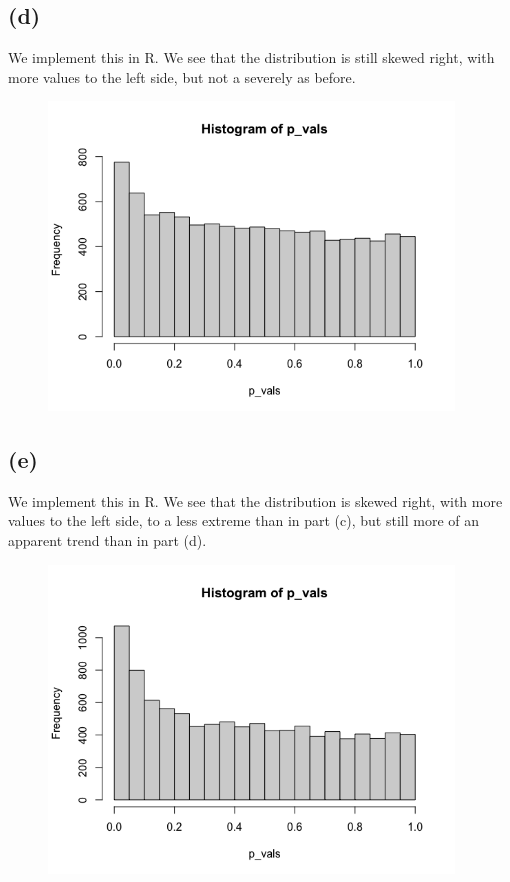 \documentclass{article}
\begin{document}
{\subsection*{(d)}

We implement this in R. We see that the distribution is still skewed right, with more values to the left side, but not a severely as before.
\begin{figure}[h!]
  \centering
  \includegraphics[width=305pt]{hw7_2d.png}
\end{figure}

\subsection*{(e)}

We implement this in R. We see that the distribution is skewed right, with more values to the left side, to a less extreme than in part (c), but still more of an apparent trend than in part (d).
\begin{figure}[h!]
  \centering
  \includegraphics[width=305pt]{hw7_2e.png}
\end{figure}

}
\end{document}

